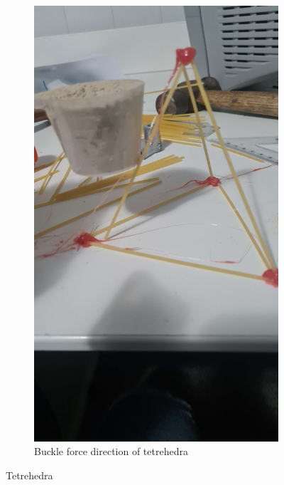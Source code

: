 \documentclass{report}
\newcommand{\subimgw}{.5\linewidth}
\begin{document}
\begin{figure}[H]
\begin{subfigure}{.5\textwidth}
		\label{fig:tetrehedra:a}
	\end{subfigure}%
	\begin{subfigure}{.5\textwidth}
		\centering
		\includegraphics[width=\subimgw]{tetrehedra-b}
		\caption{Buckle force direction of tetrehedra}

		\label{fig:tetrehedra:untranslated}
	\end{subfigure}

	\caption{Tetrehedra}
	\label{fig:tetrehedra}
\end{figure}
\end{document}

